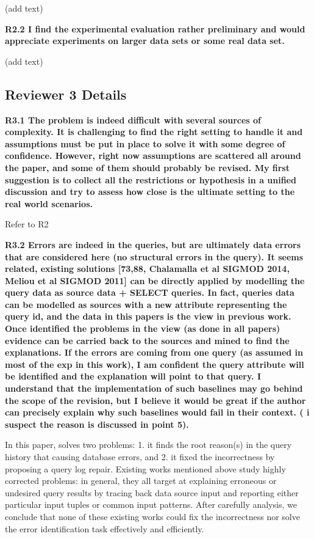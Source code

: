 (add text)

\noindent \textbf{R2.2 I find the experimental evaluation rather preliminary and would appreciate experiments on larger data sets or some real data set.}

(add text)
\subsection*{Reviewer 3 Details}

\noindent \textbf{R3.1 The problem is indeed difficult with several sources of complexity. It is challenging to find the right setting to handle it and assumptions must be put in place to solve it with some degree of confidence. However, right now assumptions are scattered all around the paper, and some of them should probably be revised.
My first suggestion is to collect all the restrictions or hypothesis in a unified discussion and try to assess how close is the ultimate setting to the real world scenarios.} 

{Refer to R2}

\noindent \textbf{R3.2 Errors are indeed in the queries, but are ultimately data errors that are considered here (no structural errors in the query). It seems related, existing solutions [73,88, Chalamalla et al SIGMOD 2014, Meliou et al SIGMOD 2011] can be directly applied by modelling the query data as source data + SELECT queries. In fact, queries data can be modelled as sources with a new attribute representing the query id, and the data in this papers is the view in previous work. Once identified the problems in the view (as done in all papers) evidence can be carried back to the sources and mined to find the explanations. If the errors are coming from one query (as assumed in most of the exp in this work), I am confident the query attribute will be identified and the explanation will point to that query. I understand that the implementation of such baselines may go behind the scope of the revision, but I believe it would be great if the author can precisely explain why such baselines would fail in their context. ( i suspect the reason is discussed in point 5). }

In this paper, \sys solves two problems: 1. it finds the root reason(s) in the query history that causing database errors, and 2. it fixed the incorrectness by proposing a query log repair. Existing works mentioned above study highly corrected problems: in general, they all target at explaining erroneous or undesired query results by tracing back data source input and reporting either particular input tuples or common input patterns. After carefully analysis, we conclude that none of these existing works could fix the incorrectness nor solve the error identification task effectively and efficiently. 

